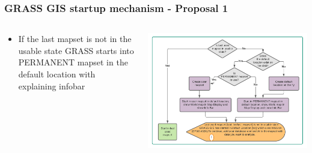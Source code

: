 \documentclass[aspectratio=169]{beamer}
\begin{document}
\begin{frame}
\frametitle{GRASS GIS startup mechanism - Proposal 1}
\begin{columns}
\begin{column}{.35\textwidth}
\begin{itemize}
\item If the last mapset is not in the usable state GRASS starts into PERMANENT mapset in the default location with explaining infobar
\end{itemize}
\end{column}
\begin{column}{.65\textwidth}
\includegraphics[width=\textwidth]{pictures/normal_user_diagram.PNG} \hspace*{4cm}
\end{column}
\end{columns}
\end{frame} 
\end{document}
